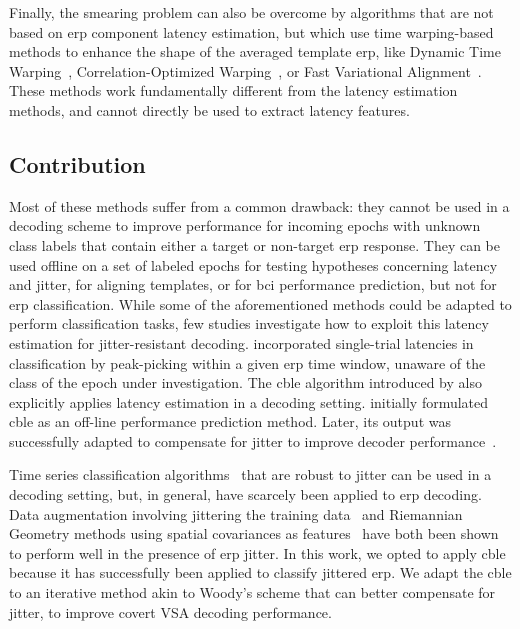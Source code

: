 Finally, the smearing problem can also be overcome by algorithms that are not
based on \ac{erp} component latency estimation, but which use time warping-based methods
to enhance the shape of the averaged template \ac{erp}, like Dynamic Time
Warping~\cite{Gupta1996, Wang2001, Zoumpoulaki2015}, Correlation-Optimized
Warping~\cite{Skov2006}, or Fast Variational
Alignment~\cite{Flotho2021}.
These methods work
fundamentally different from the latency estimation methods, and cannot
directly be used to extract latency features.

\subsection{Contribution}
\label{sec:wcble/literature/contrib}


Most of these methods suffer from a common drawback: they cannot be used in a
decoding scheme to improve performance for incoming epochs with unknown
class labels that contain either a target or non-target \ac{erp} response.
They can be used offline on a set of labeled epochs for testing hypotheses
concerning latency and jitter, for aligning templates, or for \ac{bci} performance
prediction, but not for \ac{erp} classification.
While some of the aforementioned methods could be adapted to perform
classification tasks, few studies investigate how to exploit this latency estimation
for jitter-resistant decoding.
\cite{Hardiansyah2020} incorporated single-trial latencies in
classification by peak-picking within a given
\ac{erp} time window, unaware of the class of the epoch under investigation.
The \ac{cble} algorithm introduced
by \cite{Thompson2012} also explicitly applies latency estimation in a
decoding setting.
\cite{Thompson2012} initially formulated \ac{cble} as an off-line performance
prediction method.
Later, its output was successfully adapted to compensate for jitter to improve
decoder performance~\cite{Mowla2017,Zisk2022}.

Time series classification algorithms~\cite{Abanda2019}
that are robust to jitter can be used in a decoding setting,
but, in general, have scarcely been applied to \ac{erp} decoding.
Data augmentation involving jittering the training
data~\cite{Krell2018,Zisk2022} and Riemannian Geometry methods using spatial
covariances as features~\cite{Aydarkhanov2020} have both been shown
to perform well in the presence of \ac{erp} jitter.
In this work, we opted to apply \ac{cble} because it has successfully been applied to
classify jittered \acs{erp}.
We adapt the \ac{cble} to an iterative method akin to Woody's scheme that can better
compensate for jitter, to improve covert VSA decoding performance.

